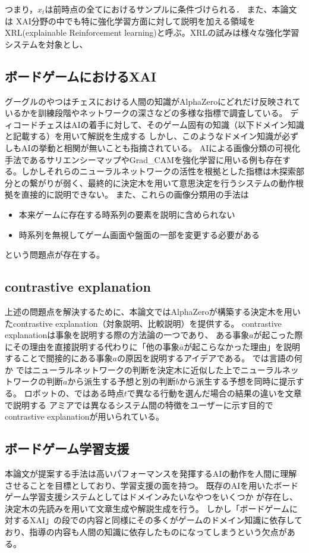 つまり，$x_t$は前時点の全てにおけるサンプルに条件づけられる．
また、本論文は
XAI分野の中でも特に強化学習方面に対して説明を加える領域をXRL(explainable Reinforcement learning)と呼ぶ。XRLの試みは様々な強化学習システムを対象とし、
\subsection{ボードゲームにおけるXAI}
グーグルのやつはチェスにおける人間の知識がAlphaZeroにどれだけ反映されているかを訓練段階やネットワークの深さなどの多様な指標で調査している。\cite{oord2016wavenet}
ディコードチェス\cite{oord2016wavenet}はAIの着手に対して、そのゲーム固有の知識（以下ドメイン知識と記載する）を用いて解説を生成する 
しかし、このようなドメイン知識が必ずしもAIの挙動と相関が無いことも指摘されている。\cite{oord2016wavenet}
AIによる画像分類の可視化手法であるサリエンシーマップ\cite{oord2016wavenet}やGrad\_CAM\cite{oord2016wavenet}を強化学習に用いる例も存在する。しかしそれらのニューラルネットワークの活性を根拠とした指標は木探索部分との繋がりが弱く、最終的に決定木を用いて意思決定を行うシステムの動作根拠を直接的に説明できない。
また、これらの画像分類用の手法は
\begin{itemize}
	\item 本来ゲームに存在する時系列の要素を説明に含められない
	\item 時系列を無視してゲーム画面や盤面の一部を変更する必要がある
\end{itemize}
という問題点が存在する。

\subsection{contrastive explanation}
上述の問題点を解決するために、本論文ではAlphaZeroが構築する決定木を用いたcontrastive explanation（対象説明、比較説明）を提供する。
contrastive explanationは事象を説明する際の方法論の一つであり、
ある事象$a$が起こった際にその理由を直接説明する代わりに「他の事象$\bar{a}$が起こらなかった理由」を説明することで間接的にある事象$a$の原因を説明するアイデアである。
 では言語の何か \cite{oord2016wavenet}ではニューラルネットワークの判断を決定木に近似した上でニューラルネットワークの判断$a$から派生する予想と別の判断$b$から派生する予想を同時に提示する。
ロボット\cite{oord2016wavenet}の、ではある時点$t$で異なる行動を選んだ場合の結果の違いを文章で説明する
アミア\cite{oord2016wavenet}では異なるシステム間の特徴をユーザーに示す目的でcontrastive explanationが用いられている。

\subsection{ボードゲーム学習支援}
本論文が提案する手法は高いパフォーマンスを発揮するAIの動作を人間に理解させることを目標としており、学習支援の面を持つ。
既存のAIを用いたボードゲーム学習支援システムとしてはドメインみたいなやつをいくつか
が存在し、決定木の先読みを用いて文章生成や解説生成を行う。
しかし「ボードゲームに対するXAI」の段での内容と同様にその多くがゲームのドメイン知識に依存しており、指導の内容も人間の知識に依存したものになってしまうという欠点がある。



